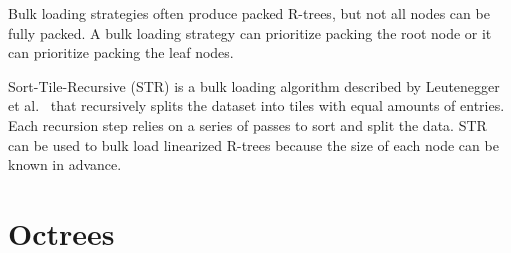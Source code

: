 Bulk loading strategies often produce packed R-trees, but not all nodes can be fully packed. A bulk loading strategy can prioritize packing the root node or it can prioritize packing the leaf nodes.

Sort-Tile-Recursive (STR) is a bulk loading algorithm described by Leutenegger et al.~\cite{leutenegger1997str} that recursively splits the dataset into tiles with equal amounts of entries. Each recursion step relies on a series of passes to sort and split the data. STR can be used to bulk load linearized R-trees because the size of each node can be known in advance.

\section{Octrees}
